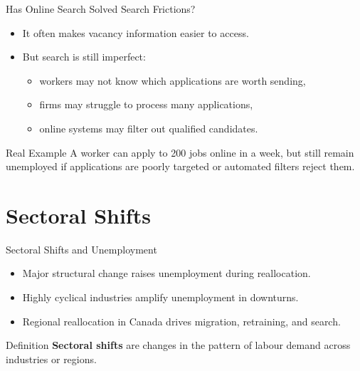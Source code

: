 \documentclass[aspectratio=169]{beamer}
\begin{document}
\begin{frame}{Has Online Search Solved Search Frictions?}
\transfade
\begin{itemize}[<+->]
  \item It often makes vacancy information easier to access.
  \item But search is still imperfect:
  \begin{itemize}[<+->]
    \item workers may not know which applications are worth sending,
    \item firms may struggle to process many applications,
    \item online systems may filter out qualified candidates.
  \end{itemize}
\end{itemize}

\begin{exampleblock}{Real Example}
A worker can apply to 200 jobs online in a week, but still remain unemployed if applications are poorly targeted or automated filters reject them.
\end{exampleblock}
\end{frame}

\section{Sectoral Shifts}

\begin{frame}{Sectoral Shifts and Unemployment}
\transfade
\begin{itemize}[<+->]
  \item Major structural change raises unemployment during reallocation.
  \item Highly cyclical industries amplify unemployment in downturns.
  \item Regional reallocation in Canada drives migration, retraining, and search.
\end{itemize}

\begin{block}{Definition}
\textbf{Sectoral shifts} are changes in the pattern of labour demand across industries or regions.
\end{block}
\end{frame}
\end{document}
